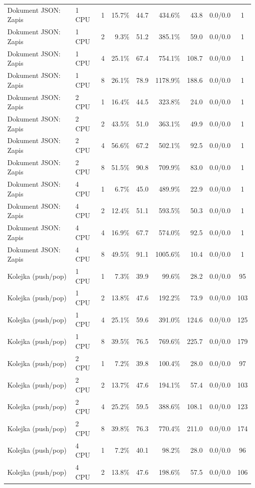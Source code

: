 \begin{table}[ht]
{\begin{tabular}{llcrrrrcc}
Dokument JSON: Zapis & 1 CPU & 1 & 15.7\% & 44.7 & 434.6\% & 43.8 & 0.0/0.0 & 1 \\
Dokument JSON: Zapis & 1 CPU & 2 & 9.3\% & 51.2 & 385.1\% & 59.0 & 0.0/0.0 & 1 \\
Dokument JSON: Zapis & 1 CPU & 4 & 25.1\% & 67.4 & 754.1\% & 108.7 & 0.0/0.0 & 1 \\
Dokument JSON: Zapis & 1 CPU & 8 & 26.1\% & 78.9 & 1178.9\% & 188.6 & 0.0/0.0 & 1 \\
Dokument JSON: Zapis & 2 CPU & 1 & 16.4\% & 44.5 & 323.8\% & 24.0 & 0.0/0.0 & 1 \\
Dokument JSON: Zapis & 2 CPU & 2 & 43.5\% & 51.0 & 363.1\% & 49.9 & 0.0/0.0 & 1 \\
Dokument JSON: Zapis & 2 CPU & 4 & 56.6\% & 67.2 & 502.1\% & 92.5 & 0.0/0.0 & 1 \\
Dokument JSON: Zapis & 2 CPU & 8 & 51.5\% & 90.8 & 709.9\% & 83.0 & 0.0/0.0 & 1 \\
Dokument JSON: Zapis & 4 CPU & 1 & 6.7\% & 45.0 & 489.9\% & 22.9 & 0.0/0.0 & 1 \\
Dokument JSON: Zapis & 4 CPU & 2 & 12.4\% & 51.1 & 593.5\% & 50.3 & 0.0/0.0 & 1 \\
Dokument JSON: Zapis & 4 CPU & 4 & 16.9\% & 67.7 & 574.0\% & 92.5 & 0.0/0.0 & 1 \\
Dokument JSON: Zapis & 4 CPU & 8 & 49.5\% & 91.1 & 1005.6\% & 10.4 & 0.0/0.0 & 1 \\
Kolejka (push/pop) & 1 CPU & 1 & 7.3\% & 39.9 & 99.6\% & 28.2 & 0.0/0.0 & 95 \\
Kolejka (push/pop) & 1 CPU & 2 & 13.8\% & 47.6 & 192.2\% & 73.9 & 0.0/0.0 & 103 \\
Kolejka (push/pop) & 1 CPU & 4 & 25.1\% & 59.6 & 391.0\% & 124.6 & 0.0/0.0 & 125 \\
Kolejka (push/pop) & 1 CPU & 8 & 39.5\% & 76.5 & 769.6\% & 225.7 & 0.0/0.0 & 179 \\
Kolejka (push/pop) & 2 CPU & 1 & 7.2\% & 39.8 & 100.4\% & 28.0 & 0.0/0.0 & 97 \\
Kolejka (push/pop) & 2 CPU & 2 & 13.7\% & 47.6 & 194.1\% & 57.4 & 0.0/0.0 & 103 \\
Kolejka (push/pop) & 2 CPU & 4 & 25.2\% & 59.5 & 388.6\% & 108.1 & 0.0/0.0 & 123 \\
Kolejka (push/pop) & 2 CPU & 8 & 39.8\% & 76.3 & 770.4\% & 211.0 & 0.0/0.0 & 174 \\
Kolejka (push/pop) & 4 CPU & 1 & 7.2\% & 40.1 & 98.2\% & 28.0 & 0.0/0.0 & 96 \\
Kolejka (push/pop) & 4 CPU & 2 & 13.8\% & 47.6 & 198.6\% & 57.5 & 0.0/0.0 & 106 \\

\end{tabular}}
\end{table}

